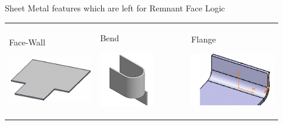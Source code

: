 \begin{frame}{Sheet Metal features which are left for Remnant Face Logic}
\begin{tabular}[h]{@{} p{0.3\linewidth} p{0.3\linewidth} p{0.3\linewidth}@{}}

Face-Wall

\includegraphics[width=0.9\linewidth]{..//Common/images/Feature_Wall.png} &

Bend

\includegraphics[width=0.6\linewidth]{..//Common/images/Feature_Bend.png} &

Flange

\includegraphics[width=0.9\linewidth]{..//Common/images/Feature_Flange.png} \\


\end{tabular}
\end{frame}
